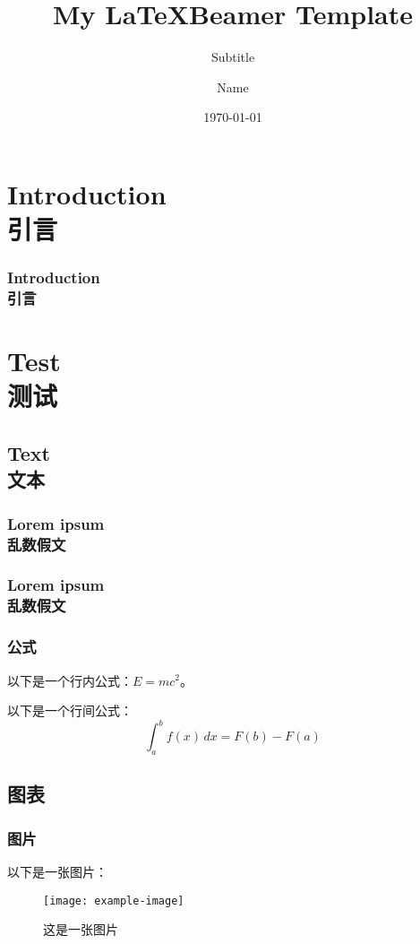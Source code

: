 \documentclass[aspectratio=169]{beamer}
\begin{document}
\title{My \LaTeX Beamer Template}
\subtitle{Subtitle}
\author{Name}
\date{\today}
\maketitle

\section{Introduction\\引言}
\begin{frame}
  \frametitle{Introduction\\引言}
  \lipsum[1]
  \framebreak
  \zhlipsum[1]
\end{frame}

\section{Test\\测试}
\subsection{Text\\文本}
\subsubsection{Lorem ipsum\\乱数假文}
\begin{frame}
  \frametitle{Lorem ipsum\\乱数假文}
  \lipsum[2]
  \framebreak
  \zhlipsum[2]
\end{frame}

\subsubsection{公式}
\begin{frame}
以下是一个行内公式：\( E = mc^2 \)。

以下是一个行间公式：
\[
\int_{a}^{b} f(x) \, dx = F(b) - F(a)
\]
\end{frame}

\subsection{图表}
\subsubsection{图片}
\begin{frame}
以下是一张图片：
\begin{figure}[htbp]
    \centering
    \texttt{[image: example-image]} %
    \caption{这是一张图片}
    \label{fig:example}
\end{figure}
\end{frame}
\end{document}
